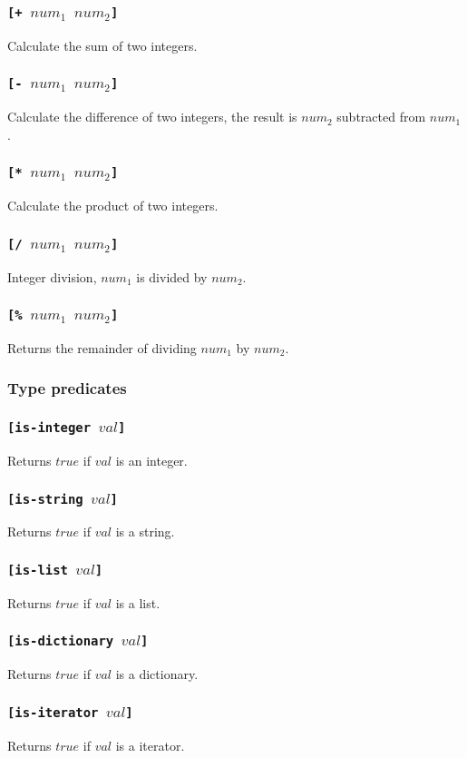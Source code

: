 \documentclass[11pt]{report}
\begin{document}
\subsubsection*{\tt{[+ }$num_1$ $num_2$\tt{]}}
Calculate the sum of two integers.
\subsubsection*{\tt{[- }$num_1$ $num_2$\tt{]}}
Calculate the difference of two integers, the result is $num_2$ subtracted from $num_1$.
\subsubsection*{\tt{[* }$num_1$ $num_2$\tt{]}}
Calculate the product of two integers.
\subsubsection*{\tt{[/ }$num_1$ $num_2$\tt{]}}
Integer division, $num_1$ is divided by $num_2$.
\subsubsection*{\tt{[\% }$num_1$ $num_2$\tt{]}}
Returns the remainder of dividing $num_1$ by $num_2$.

\subsubsection{Type predicates}
\subsubsection*{\tt{[is-integer }$val$\tt{]}}
Returns $true$ if $val$ is an integer.
\subsubsection*{\tt{[is-string }$val$\tt{]}}
Returns $true$ if $val$ is a string.
\subsubsection*{\tt{[is-list }$val$\tt{]}}
Returns $true$ if $val$ is a list.
\subsubsection*{\tt{[is-dictionary }$val$\tt{]}}
Returns $true$ if $val$ is a dictionary.
\subsubsection*{\tt{[is-iterator }$val$\tt{]}}
Returns $true$ if $val$ is a iterator.
\end{document}
